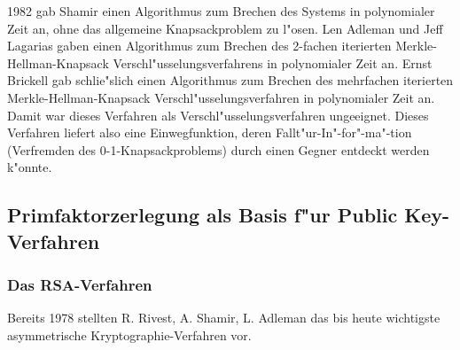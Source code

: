 1982 gab  Shamir \cite{Shamir1982} einen Algorithmus zum Brechen des Systems in polynomialer Zeit an, ohne das allgemeine Knapsackproblem zu l"osen. Len  Adleman \cite{Adleman1982} und Jeff Lagarias  \cite{Lagarias1983} gaben einen Algorithmus zum Brechen des 2-fachen iterierten Merkle-Hellman-Knapsack Verschl"usselungsverfahrens in polynomialer Zeit an. Ernst Brickell  \cite{Brickell1985} gab schlie"slich einen Algorithmus zum Brechen des mehrfachen iterierten Merkle-Hellman-Knapsack Verschl"usselungsverfahren in polynomialer Zeit an. Damit war dieses Verfahren als Verschl"usselungsverfahren ungeeignet. Dieses Verfahren liefert also eine Einwegfunktion, deren Fallt"ur-In"-for"-ma"-tion (Verfremden des 0-1-Knapsackproblems) durch einen Gegner entdeckt werden k"onnte.


\subsection{Primfaktorzerlegung als Basis f"ur Public Key-Verfahren}


\subsubsection{Das RSA-Verfahren}
 \hypertarget{RSAVerfahren}{} Bereits 1978 stellten R.  Rivest,  A. Shamir,   L. Adleman \cite{RSA1978} das bis heute wichtigste 
asymmetrische Kryptographie-Verfahren vor.  \par

\begin{center}
\end{center}

